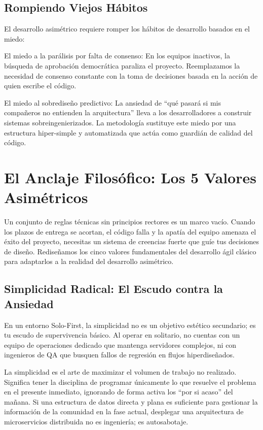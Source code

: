 \documentclass[14pt,a4paper,oneside]{extbook}
\begin{document}
\section{Rompiendo Viejos Hábitos}

El desarrollo asimétrico requiere romper los hábitos de desarrollo basados en el miedo:

El miedo a la parálisis por falta de consenso: En los equipos inactivos, la búsqueda de aprobación democrática paraliza el proyecto. Reemplazamos la necesidad de consenso constante con la toma de decisiones basada en la acción de quien escribe el código.

El miedo al sobrediseño predictivo: La ansiedad de \enquote{qué pasará si mis compañeros no entienden la arquitectura} lleva a los desarrolladores a construir sistemas sobreingenierizados. La metodología sustituye este miedo por una estructura hiper-simple y automatizada que actúa como guardián de calidad del código.


\chapter{El Anclaje Filosófico: Los 5 Valores Asimétricos}

Un conjunto de reglas técnicas sin principios rectores es un marco vacío. Cuando los plazos de entrega se acortan, el código falla y la apatía del equipo amenaza el éxito del proyecto, necesitas un sistema de creencias fuerte que guíe tus decisiones de diseño. Rediseñamos los cinco valores fundamentales del desarrollo ágil clásico para adaptarlos a la realidad del desarrollo asimétrico.

\section{Simplicidad Radical: El Escudo contra la Ansiedad}

En un entorno Solo-First, la simplicidad no es un objetivo estético secundario; es tu escudo de supervivencia básico. Al operar en solitario, no cuentas con un equipo de operaciones dedicado que mantenga servidores complejos, ni con ingenieros de QA que busquen fallos de regresión en flujos hiperdiseñados.

La simplicidad es el arte de maximizar el volumen de trabajo no realizado. Significa tener la disciplina de programar únicamente lo que resuelve el problema en el presente inmediato, ignorando de forma activa los \enquote{por si acaso} del mañana. Si una estructura de datos directa y plana es suficiente para gestionar la información de la comunidad en la fase actual, desplegar una arquitectura de microservicios distribuida no es ingeniería; es autosabotaje.
\end{document}
